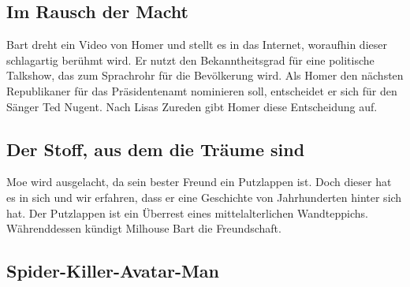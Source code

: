 \subsection{Im Rausch der Macht}\label{PABF03}
Bart dreht ein Video von Homer und stellt es in das Internet, woraufhin dieser schlagartig berühmt wird. Er nutzt den Bekanntheitsgrad für eine politische Talkshow, das zum Sprachrohr für die Bevölkerung wird. Als Homer den nächsten Republikaner für das Präsidentenamt nominieren soll, entscheidet er sich für den Sänger Ted Nugent. Nach Lisas Zureden gibt Homer diese Entscheidung auf. 


\subsection{Der Stoff, aus dem die Träume sind}
Moe wird ausgelacht, da sein bester Freund ein Putzlappen ist. Doch dieser hat es in sich und wir erfahren, dass er eine Geschichte von Jahrhunderten hinter sich hat. Der Putzlappen ist ein Überrest eines mittelalterlichen Wandteppichs.  Währenddessen kündigt Milhouse Bart die Freundschaft.


\subsection{Spider-Killer-Avatar-Man}

